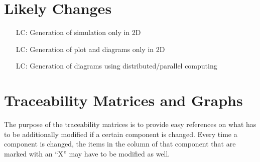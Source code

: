 \documentclass[12pt]{article}
\newcounter{lcnum} %
\begin{document}

\newpage

\section{Likely Changes}    

\noindent \begin{itemize}

\item[LC\refstepcounter{lcnum}\thelcnum \label{only2dsim}:] Generation of 
simulation only in 2D
\item[LC\refstepcounter{lcnum}\thelcnum \label{only2dplot}:] Generation of 
plot and diagrams only in 2D
\item[LC\refstepcounter{lcnum}\thelcnum \label{maybe-mpi}:] Generation of 
diagrams using distributed/parallel computing

\end{itemize}

\section{Traceability Matrices and Graphs}

The purpose of the traceability matrices is to provide easy references on what
has to be additionally modified if a certain component is changed. Every time a
component is changed, the items in the column of that component that are marked
with an ``X'' may have to be modified as well. 

\end{document}
